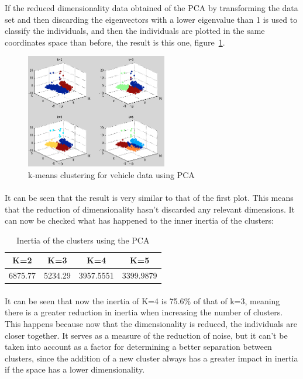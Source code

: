 \documentclass[12pt, a4paper]{article}
\begin{document}
If the reduced dimensionality data obtained of the PCA by transforming the data set and then discarding the eigenvectors with a lower eigenvalue than 1 is used to classify the individuals, and then the individuals are plotted in the same coordinates space than before, the result is this one, figure~\ref{fig:Cars_2}.
\begin{figure}[ht!]
	\centering
	\includegraphics[width=0.55\textwidth]{img/Cars_2}
	\caption{k-means clustering for vehicle data using PCA}
	\label{fig:Cars_2}
\end{figure}

\paragraph{}It can be seen that the result is very similar to that of the first plot. This means that the reduction of dimensionality hasn't discarded any relevant dimensions. It can now be checked what has happened to the inner inertia of the clusters:
\begin{table}[ht!]
	\centering
	\begin{tabular}{|c|c|c|c|}
		\hline
		\rowcolor[gray]{0.85} \textbf{K=2}&\textbf{K=3}&\textbf{K=4}&\textbf{K=5}\\\hline
		6875.77&5234.29&3957.5551&3399.9879\\\hline
	\end{tabular}
	\caption{Inertia of the clusters using the PCA}
\end{table}
\paragraph{}It can be seen that now the inertia of K=4 is 75.6\% of that of k=3, meaning there is a greater reduction in inertia when increasing the number of clusters. This happens because now that the dimensionality is reduced, the individuals are closer together. It serves as a measure of the reduction of noise, but it can't be taken into account as a factor for determining a better separation between clusters, since the addition of a new cluster always has a greater impact in inertia if the space has a lower dimensionality.
\end{document}
